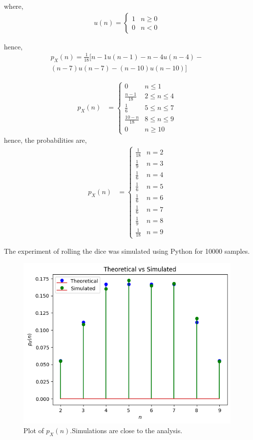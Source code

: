 \documentclass[journal,12pt,twocolumn]{IEEEtran}
\theoremstyle{remark}
\begin{document}
where,
\begin{align}
u(n) =
\begin{cases}
1 & n \ge 0
\\
0 & n < 0
\end{cases}
\end{align}

hence,
\begin{multline}
p_{X}(n) = \frac{1}{18}[{{n-1}u(n-1)-{n-4}u(n-4)-}\\
              {(n-7)u(n-7)-(n-10)u(n-10)}]
\end{multline}

\begin{align}
  p_X(n) &= 
  \begin{cases}
  0 & n \le 1
  \\
  \frac{n-1}{18} &  2 \le n \le  4
  \\
  \frac{1}{6} & 5 \le n \le 7
  \\
  \frac{10-n}{18} & 8 \le n \le 9
  \\
  0 & n \ge 10
  \end{cases}
  \end{align}
hence, the probabilities are,
\begin{align}
  p_X(n) &= 
\begin{cases}
   \frac{1}{18} & n = 2 \\
   \frac{1}{9} & n = 3 \\
   \frac{1}{6} & n = 4 \\
   \frac{1}{6} & n = 5 \\
   \frac{1}{6} & n = 6 \\
   \frac{1}{6} & n = 7 \\
   \frac{1}{9} & n = 8 \\
   \frac{1}{18} & n = 9 
\end{cases}
\end{align}

\bigskip
The experiment of rolling the dice was simulated using Python for 10000 samples.  
%
\begin{figure}[!ht]
\centering
\includegraphics[width=\columnwidth]{exemplar/10/13/3/23/figs/pmf.png}
\caption{Plot of $p_X(n)$.Simulations are close to the analysis. }
\end{figure}
\end{document}
